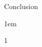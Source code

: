 \begin{frame}{Conclusion}

    \begin{itemize-size}{1em}
        \item  1
    \end{itemize-size}
    
\end{frame}
